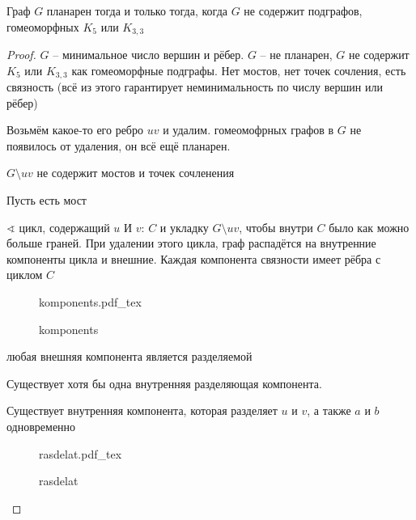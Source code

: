 \documentclass{book}
\theoremstyle{definition}
\newcommand{\incfig}[1]{%
    \def\svgwidth{\columnwidth}
    {#1.pdf_tex}
}
\begin{document}
\begin{theorem}
    Граф $G$ планарен тогда и только тогда, когда  $G$ не содержит подграфов, гомеоморфных  $K_5$ или $K_{3,3}$
\end{theorem}
\begin{proof}
    $G$ -- минимальное число вершин и рёбер.  $G$ -- не планарен,  $G$ не содержит  $K_5$ или $K_{3,3}$ как гомеоморфные подграфы. Нет мостов, нет точек сочления, есть связность (всё из этого гарантирует неминимальность по числу вершин или рёбер)

    Возьмём какое-то его ребро $uv$ и удалим. гомеомофрных графов в $G$ не появилось от удаления, он всё ещё планарен.

    \begin{lemma}
        $G\setminus uv$ не содержит мостов и точек сочленения

        Пусть есть мост


    \end{lemma}


    $\sphericalangle $ цикл, содержащий $u$ И  $v$:  $C$ и укладку  $G \setminus  uv$, чтобы внутри $C$ было как можно больше граней. При удалении этого цикла, граф распадётся на внутренние компоненты цикла и внешние. Каждая компонента связности имеет рёбра с циклом  $C$


\begin{figure}[!ht]
    \centering
    \incfig{komponents}
    \caption{komponents}
    \label{fig:komponents}
\end{figure}

     \begin{lemma}
         любая внешняя компонента является разделяемой
    \end{lemma}

    \begin{lemma}
        Существует хотя бы одна внутренняя разделяющая компонента.
    \end{lemma}

    \begin{lemma}
        Существует внутренняя компонента, которая разделяет $u$ и  $v$, а также  $a$ и  $b$ одновременно
    \end{lemma}

\begin{figure}[!ht]
    \centering
    \incfig{rasdelat}
    \caption{rasdelat}
    \label{fig:rasdelat}
\end{figure}
\end{proof}
\end{document}
